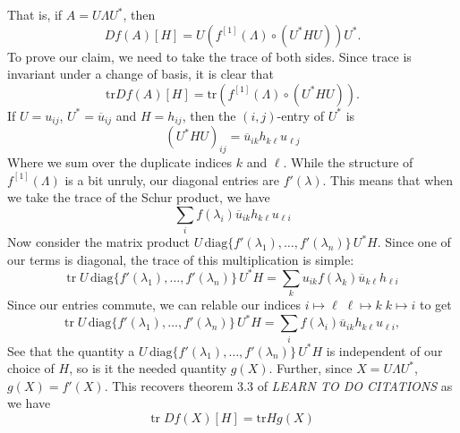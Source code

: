 \documentclass[12pt]{exam}
\begin{document}
That is, if $A = U   \Lambda U ^{*} $, then
\[
  Df(A)[H] = U \left( f ^{[1]} (\Lambda) \circ (U ^{* } H U) \right)U ^{*}.
\]
%
To prove our claim, we need to take the trace of both sides. Since trace is
invariant under a change of basis, it is clear that
\[
  \text{tr}Df(A)[H] = \text{tr} \left( f ^{[1]} (\Lambda) \circ (U ^{* } H U) \right).
\]
If $U = u_{ij}$, $U ^{*} = \overline{u}_{ij}$ and $H = h_{ij}$, then the
$(i,j)$-entry of $U ^{*}$ is
\[
  {(U ^{* } H U)}_{ij} = \overline{u}_{ik}h_{k\ell}u_{\ell j}
\]
Where we sum over the duplicate indices $k$ and $\ell$. While the structure of
$f ^{[1]} (\Lambda)$ is a bit unruly, our diagonal entries are $f'(\lambda)$.
This means that when we take the trace of the Schur product, we have
\[
  \sum_i f(\lambda_i)\overline{u}_{ik}h_{k\ell}u_{\ell i}
\]
Now consider the matrix product
$U\, \text{diag} \{f'(\lambda_1), \dots ,f'(\lambda_n)\} \,U ^{*} H $. Since one of our terms
is diagonal, the trace of this multiplication is simple:
\[
  \text{tr}\; U \,\text{diag} \{f'(\lambda_1), \dots ,f'(\lambda_n)\}\, U ^{*} H
  = \sum_k u_{ik}f(\lambda_k) \overline{u}_{k \ell} h_{\ell i}
\]
Since our entries commute, we can relable our indices
$i \mapsto \ell\; \ell \mapsto k \; k \mapsto i $ to get
\[
  \text{tr}\; U \,\text{diag} \{f'(\lambda_1), \dots ,f'(\lambda_n)\}\, U ^{*} H
  = \sum_i f(\lambda_i) \overline{u}_{i k} h_{k \ell}u_{\ell i},
\]
See that the quantity a
$U\, \text{diag} \{f'(\lambda_1), \dots ,f'(\lambda_n)\} \,U ^{*} H $ is
independent of our choice of $H$, so is it the needed quantity $g(X)$. Further,
since $X = U \Lambda U ^{*} $, $g(X) = f'(X)$. This recovers theorem 3.3 of
\emph{LEARN TO DO CITATIONS} as we have
\[
  \text{tr} \; Df(X)[H] = \text{tr} H g(X)
\]

\bigskip

\bigskip

\bigskip
\end{document}
